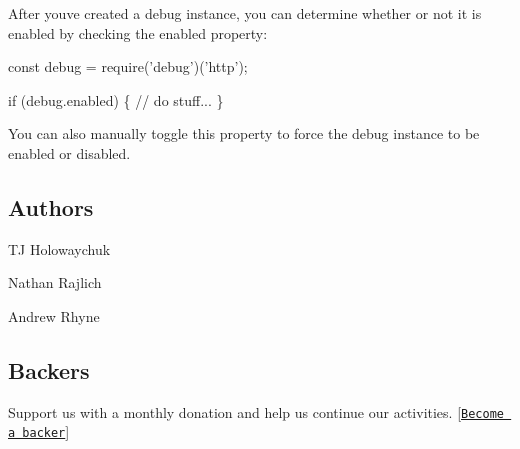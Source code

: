 After you\textquotesingle{}ve created a debug instance, you can determine whether or not it is enabled by checking the {\ttfamily enabled} property\+:


\begin{DoxyCode}
const debug = require('debug')('http');

if (debug.enabled) \{
  // do stuff...
\}
\end{DoxyCode}


You can also manually toggle this property to force the debug instance to be enabled or disabled.

\subsection*{Authors}


\begin{DoxyItemize}
\item TJ Holowaychuk
\item Nathan Rajlich
\item Andrew Rhyne
\end{DoxyItemize}

\subsection*{Backers}

Support us with a monthly donation and help us continue our activities. \mbox{[}\href{https://opencollective.com/debug#backer}{\tt Become a backer}\mbox{]}

